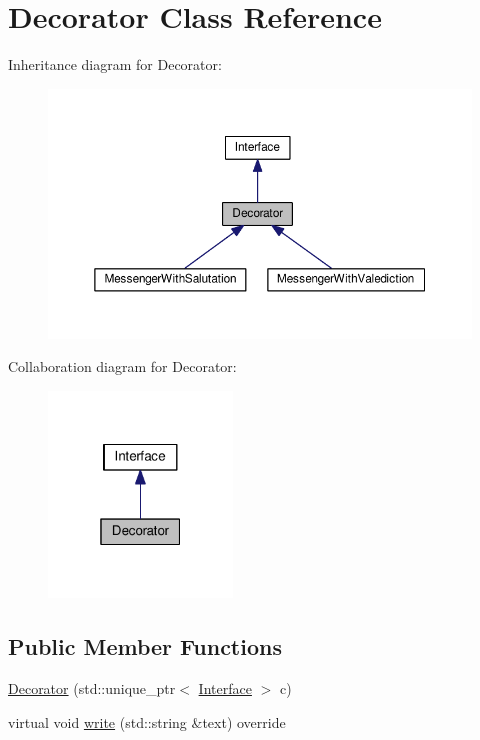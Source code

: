 \hypertarget{classDecorator}{}\section{Decorator Class Reference}
\label{classDecorator}


Inheritance diagram for Decorator\+:
\nopagebreak
\begin{figure}[H]
\begin{center}
\leavevmode
\includegraphics[width=350pt]{classDecorator__inherit__graph}
\end{center}
\end{figure}


Collaboration diagram for Decorator\+:
\nopagebreak
\begin{figure}[H]
\begin{center}
\leavevmode
\includegraphics[width=139pt]{classDecorator__coll__graph}
\end{center}
\end{figure}
\subsection*{Public Member Functions}
\begin{DoxyCompactItemize}
\item 
\hyperlink{classDecorator_aee6cdf11333827f13ea5b5384ad5af88}{Decorator} (std\+::unique\+\_\+ptr$<$ \hyperlink{classInterface}{Interface} $>$ c)
\item 
virtual void \hyperlink{classDecorator_ae5cad6daee450fb5eaa2b1cad6a0dd45}{write} (std\+::string \&text) override
\end{DoxyCompactItemize}
